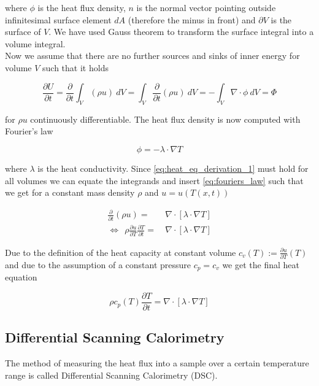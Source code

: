 \documentclass{scrartcl}[12pt, halfparskip]
\numberwithin{equation}{section}
\numberwithin{figure}{section}
\numberwithin{table}{section}
\begin{document}
where $\phi$ is the heat flux density, $n$ is the normal vector pointing outside infinitesimal surface element $dA$ (therefore the minus in front) and $\partial V$ is the surface of $V$. We have used Gauss theorem to transform the surface integral into a volume integral. \\
Now we assume that there are no further sources and sinks of inner energy for volume $V$ such that it holds

\begin{equation}
	\frac{\partial U}{\partial t} = \frac{\partial}{\partial t} \int_V (\rho u) \ dV = \int_V \frac{\partial}{\partial t}(\rho u) \ dV = - \int_{V} \nabla \cdot \phi \ dV = \varPhi
	\label{eq:heat_eq_derivation_1}
\end{equation}

for $\rho u$ continuously differentiable. The heat flux density is now computed with Fourier's law

\begin{equation}
	\phi = - \lambda \cdot \nabla T
	\label{eq:fouriers_law}
\end{equation}

where $\lambda$ is the heat conductivity. Since \cref{eq:heat_eq_derivation_1} must hold for all volumes we can equate the integrands and insert \cref{eq:fouriers_law} such that we get for a constant mass density $\rho$ and $u = u(T(x,t))$

\begin{align}
	\frac{\partial}{\partial t}(\rho u) = & \ \nabla \cdot \left[ \lambda \cdot \nabla T \right] \\
	\Leftrightarrow \ \ \rho \frac{\partial u}{\partial T} \frac{\partial T}{\partial t} = & \ \nabla \cdot \left[ \lambda \cdot \nabla T \right]
\end{align}

Due to the definition of the heat capacity at constant volume $c_v(T) := \frac{\partial u}{\partial T}(T)$ and due to the assumption of a constant pressure $c_p = c_v$ we get the final heat equation

\begin{equation}
	\rho c_p(T) \frac{\partial T}{\partial t} = \nabla \cdot \left[ \lambda \cdot \nabla T \right]
	\label{eq:heat_equation_derivation}
\end{equation}




\subsection{Differential Scanning Calorimetry}
\label{sec:physics_DSC}
The method of measuring the heat flux into a sample over a certain temperature range is called Differential Scanning Calorimetry (DSC). 
\end{document}

